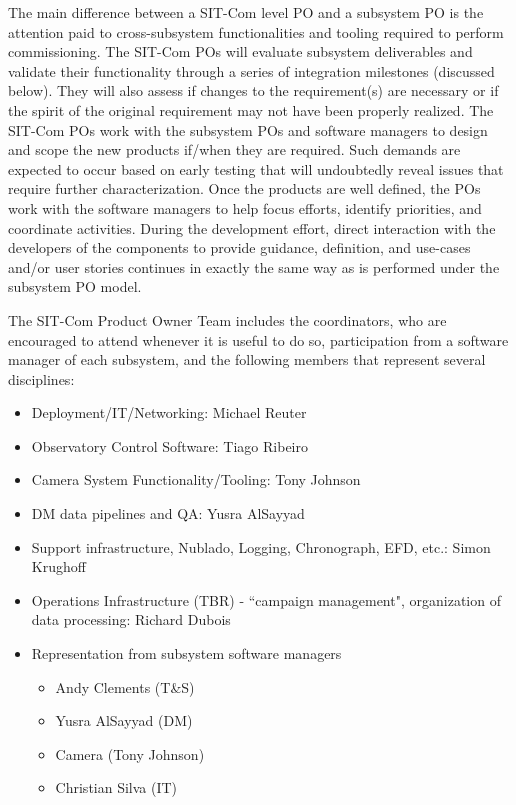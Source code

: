 \documentclass[SE,lsstdraft,authoryear,toc]{lsstdoc, lsstdraft}
\begin{document}
The main difference between a SIT-Com level PO and a subsystem PO is the attention paid to cross-subsystem functionalities and tooling required to perform commissioning.
The SIT-Com POs will evaluate subsystem deliverables and validate their functionality through a series of integration milestones (discussed below).
They will also assess if changes to the requirement(s) are necessary or if the spirit of the original requirement may not have been properly realized.
The SIT-Com POs work with the subsystem POs and software managers to design and scope the new products if/when they are required.
Such demands are expected to occur based on early testing that will undoubtedly reveal issues that require further characterization.
Once the products are well defined, the POs work with the software managers to help focus efforts, identify priorities, and coordinate activities.
During the development effort, direct interaction with the developers of the components to provide guidance, definition, and use-cases and/or user stories continues in exactly the same way as is performed under the subsystem PO model.

The SIT-Com Product Owner Team includes the coordinators, who are encouraged to attend whenever it is useful to do so, participation from a software manager of each subsystem, and the following members that represent several disciplines:

\begin{itemize}
    \item Deployment/IT/Networking: Michael Reuter
    \item Observatory Control Software: Tiago Ribeiro
    \item Camera System Functionality/Tooling: Tony Johnson
    \item DM data pipelines and QA: Yusra AlSayyad
    \item Support infrastructure, Nublado, Logging, Chronograph, EFD, etc.: Simon Krughoff
    \item Operations Infrastructure (TBR) -  ``campaign management", organization of data processing: Richard Dubois
    \item Representation from subsystem software managers
    \begin{itemize}
        \item Andy Clements (T\&S)
        \item Yusra AlSayyad (DM)
        \item Camera (Tony Johnson)
        \item Christian Silva (IT)
    \end{itemize}

\end{itemize}
\end{document}
